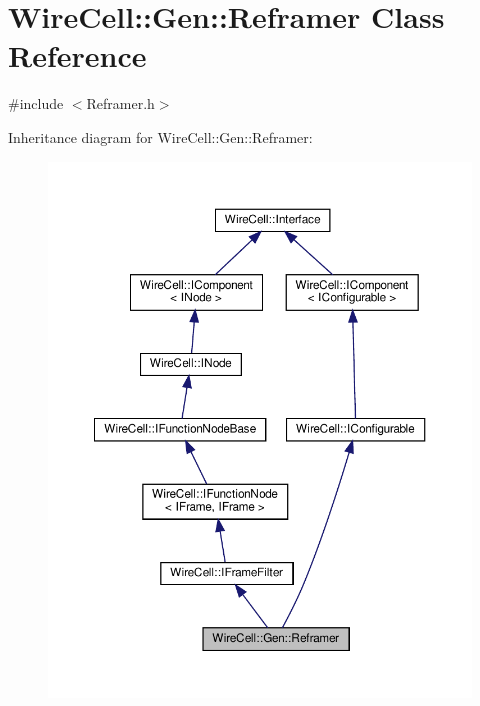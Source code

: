 \hypertarget{class_wire_cell_1_1_gen_1_1_reframer}{}\section{Wire\+Cell\+:\+:Gen\+:\+:Reframer Class Reference}
\label{class_wire_cell_1_1_gen_1_1_reframer}


{\ttfamily \#include $<$Reframer.\+h$>$}



Inheritance diagram for Wire\+Cell\+:\+:Gen\+:\+:Reframer\+:
\nopagebreak
\begin{figure}[H]
\begin{center}
\leavevmode
\includegraphics[width=350pt]{class_wire_cell_1_1_gen_1_1_reframer__inherit__graph}
\end{center}
\end{figure}


